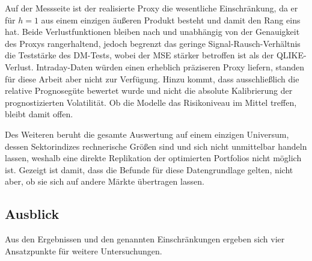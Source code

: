 \documentclass[12pt,a4paper]{article}
\begin{document}
Auf der Messseite ist der realisierte Proxy die wesentliche Einschränkung, da er für $h = 1$ aus einem einzigen äußeren Produkt besteht und damit den Rang eins hat.
Beide Verlustfunktionen bleiben nach \textcite{patton2011} und \textcite{laurent2013} unabhängig von der Genauigkeit des Proxys rangerhaltend, jedoch begrenzt das geringe Signal-Rausch-Verhältnis die Teststärke des DM-Tests, wobei der MSE stärker betroffen ist als der QLIKE-Verlust.
Intraday-Daten würden einen erheblich präziseren Proxy liefern, standen für diese Arbeit aber nicht zur Verfügung.
Hinzu kommt, dass ausschließlich die relative Prognosegüte bewertet wurde und nicht die absolute Kalibrierung der prognostizierten Volatilität.
Ob die Modelle das Risikoniveau im Mittel treffen, bleibt damit offen.

Des Weiteren beruht die gesamte Auswertung auf einem einzigen Universum, dessen Sektorindizes rechnerische Größen sind und sich nicht unmittelbar handeln lassen, weshalb eine direkte Replikation der optimierten Portfolios nicht möglich ist.
Gezeigt ist damit, dass die Befunde für diese Datengrundlage gelten, nicht aber, ob sie sich auf andere Märkte übertragen lassen.


\fi

\subsection{Ausblick}\label{sec:forschung}
Aus den Ergebnissen und den genannten Einschränkungen ergeben sich vier Ansatzpunkte für weitere Untersuchungen.
\end{document}
